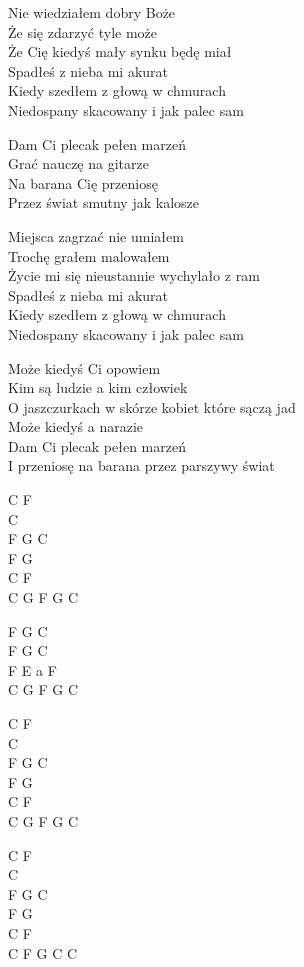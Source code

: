 \begin{text}
    Nie wiedziałem dobry Boże\\
    Że się zdarzyć tyle może\\
    Że Cię kiedyś mały synku będę miał\\
    Spadłeś z nieba mi akurat\\
    Kiedy szedłem z głową w chmurach\\
    Niedospany skacowany i jak palec sam

    \vin Dam Ci plecak pełen marzeń\\
    \vin Grać nauczę na gitarze\\
    \vin Na barana Cię przeniosę\\
    \vin Przez świat smutny jak kalosze

    Miejsca zagrzać nie umiałem\\
    Trochę grałem malowałem\\
    Życie mi się nieustannie wychylało z ram\\
    Spadłeś z nieba mi akurat\\
    Kiedy szedłem z głową w chmurach\\
    Niedospany skacowany i jak palec sam

    Może kiedyś Ci opowiem\\
    Kim są ludzie a kim człowiek\\
    O jaszczurkach w skórze kobiet które sączą jad\\
    Może kiedyś a narazie\\
    Dam Ci plecak pełen marzeń\\
    I przeniosę na barana przez parszywy świat 
\end{text}
\begin{chord}
    C F\\
    C\\
    F G C\\
    F G\\
    C F\\
    C G F G C

    F G C\\
    F G C\\
    F E a F\\
    C G F G C

    C F\\
    C\\
    F G C\\
    F G\\
    C F\\
    C G F G C

    C F\\
    C\\
    F G C\\
    F G\\
    C F\\
    C F G C C
\end{chord}